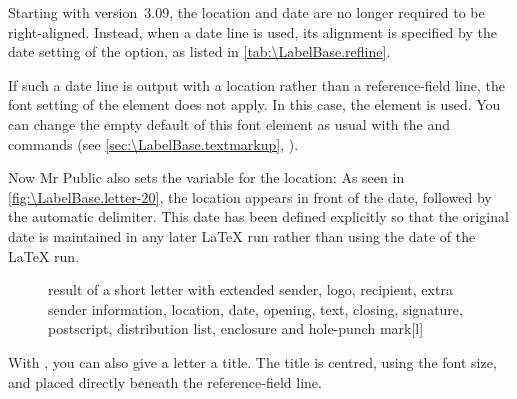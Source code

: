 Starting with version~3.09, the location
and date are no longer required to be right-aligned. Instead, when a date
line is used, its alignment is specified by the date setting of the
 option, as listed in
\autoref{tab:\LabelBase.refline}.

\BeginIndexGroup
{}%
If such a date line is output with a
location rather than a reference-field line, the font setting of the
 element does not apply. In this
case, the 
element is used. You can change the empty default of this font element as
usual with the  and
 commands (see
\autoref{sec:\LabelBase.textmarkup},
).%
\EndIndexGroup

\begin{Example}
  Now Mr Public also sets the variable for the location:%
  As seen in \autoref{fig:\LabelBase.letter-20}, the location appears
  in front of the date, followed by the automatic delimiter. This date has
  been defined explicitly so that the original date is maintained in any later
  \LaTeX{} run rather than using the date of the \LaTeX{} run.
  \begin{figure}
    \setcapindent{0pt}%
    \begin{captionbeside}
      {result of a short letter with extended sender, logo, recipient,
        extra sender information, location, date, opening, text, closing,
        signature, postscript, distribution list, enclosure and hole-punch
        mark}[l]
    \end{captionbeside}
    \label{fig:\LabelBase.letter-20}
  \end{figure}
\end{Example}
%
\EndIndexGroup
\EndIndexGroup
\EndIndexGroup


\begin{Declaration}
\end{Declaration}
With \KOMAScript{}, you can also give a letter a title. The title
is centred, using the  font size, and placed directly beneath the
reference-field line.

